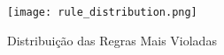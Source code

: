 \documentclass[12pt]{article}
\begin{document}
\begin{figure}[H]
\centering
\texttt{[image: rule\_distribution.png]}
\caption{Distribuição das Regras Mais Violadas}
\label{fig:rule_distribution}
\end{figure}


\end{document}
